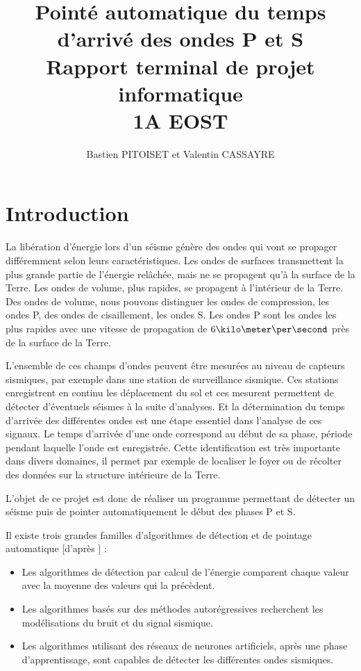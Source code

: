 \documentclass[a4paper, 11pt]{article} %
\title{
Pointé automatique du temps d'arrivé des ondes P et S \\
\large Rapport terminal de projet informatique \\
1A EOST \\
}
\author{Bastien PITOISET et Valentin CASSAYRE}
\begin{document}
\maketitle
\tableofcontents

\newpage

\section{Introduction}

La libération d'énergie lors d'un séisme génère des ondes qui vont se propager différemment selon leurs caractéristiques. Les ondes de surfaces transmettent la plus grande partie de l'énergie relâchée, mais ne se propagent qu'à la surface de la Terre. Les ondes de volume, plus rapides, se propagent à l'intérieur de la Terre. Des ondes de volume, nous pouvons distinguer les ondes de compression, les ondes P, des ondes de cisaillement, les ondes S. Les ondes P sont les ondes les plus rapides avec une vitesse de propagation de $6 \kilo\meter\per\second$ près de la surface de la Terre.

L'ensemble de ces champs d'ondes peuvent être mesurées au niveau de capteurs sismiques, par exemple dans une station de surveillance sismique. Ces stations enregistrent en continu les déplacement du sol et ces mesurent permettent de détecter d'éventuels séismes à la suite d'analyses. Et la détermination du temps d'arrivée des différentes ondes est une étape essentiel dans l'analyse de ces signaux. Le temps d'arrivée d'une onde correspond au début de sa phase, période pendant laquelle l'onde est enregistrée. Cette identification est très importante dans divers domaines, il permet par exemple de localiser le foyer ou de récolter des données sur la structure intérieure de la Terre.

L'objet de ce projet est donc de réaliser un programme permettant de détecter un séisme puis de pointer automatiquement le début des phases P et S. 

Il existe trois grandes familles d’algorithmes de détection et de pointage automatique [d'après \cite{probatoire}] :
\begin{itemize}
  \item Les algorithmes de détection par calcul de l’énergie comparent chaque valeur avec la moyenne des valeurs qui la précèdent. 
  \item Les algorithmes basés sur des méthodes autorégressives recherchent les modélisations du bruit et du signal sismique. 
  \item Les algorithmes utilisant des réseaux de neurones artificiels, après une phase d’apprentissage, sont capables de détecter les différentes ondes sismiques. 
\end{itemize}
\end{document}
